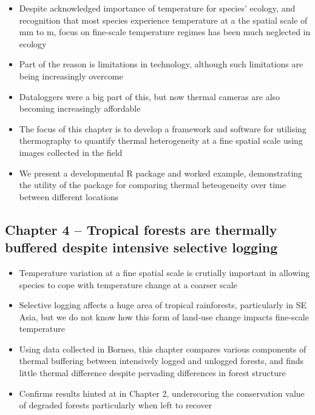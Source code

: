 \documentclass[12pt,a4paper,]{report}
\providecommand{\tightlist}{%
  \setlength{\itemsep}{0pt}\setlength{\parskip}{0pt}}
\theoremstyle{definition}
\theoremstyle{definition}
\theoremstyle{definition}
\theoremstyle{remark}
\begin{document}
\begin{itemize}
\tightlist
\item
  Despite acknowledged importance of temperature for species' ecology,
  and recognition that most species experience temperature at a the
  spatial scale of mm to m, focus on fine-scale temperature regimes has
  been much neglected in ecology
\item
  Part of the reason is limitations in technology, although such
  limitations are being increasingly overcome
\item
  Dataloggers were a big part of this, but now thermal cameras are also
  becoming increasingly affordable
\item
  The focus of this chapter is to develop a framework and software for
  utilising thermography to quantify thermal heterogeneity at a fine
  spatial scale using images collected in the field
\item
  We present a developmental R package and worked example, demonstrating
  the utility of the package for comparing thermal heteogeneity over
  time between different locations
\end{itemize}

\subsection{Chapter 4 -- Tropical forests are thermally buffered despite
intensive selective
logging}\label{chapter-4-tropical-forests-are-thermally-buffered-despite-intensive-selective-logging}

\begin{itemize}
\tightlist
\item
  Temperature variation at a fine spatial scale is crutially important
  in allowing species to cope with temperature change at a coarser scale
\item
  Selective logging affects a huge area of tropical rainforests,
  particularly in SE Asia, but we do not know how this form of land-use
  change impacts fine-scale temperature
\item
  Using data collected in Borneo, this chapter compares various
  components of thermal buffering between intensively logged and
  unlogged forests, and finds little thermal difference despite
  pervading differences in forest structure
\item
  Confirms results hinted at in Chapter 2, underscoring the conservation
  value of degraded forests particularly when left to recover
\end{itemize}
\end{document}
